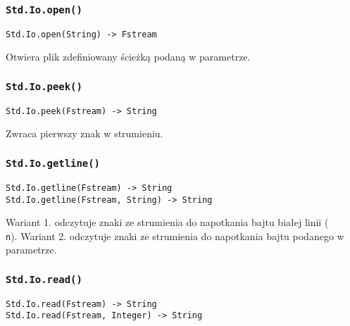 \subsubsection{\texttt{Std.Io.open()}}

\begin{small}
\begin{lstlisting}
Std.Io.open(String) -> Fstream
\end{lstlisting}
\end{small}

Otwiera plik zdefiniowany ścieżką podaną w parametrze.

\subsubsection{\texttt{Std.Io.peek()}}

\begin{small}
\begin{lstlisting}
Std.Io.peek(Fstream) -> String
\end{lstlisting}
\end{small}

Zwraca pierwszy znak w strumieniu.

\subsubsection{\texttt{Std.Io.getline()}}

\begin{small}
\begin{lstlisting}
Std.Io.getline(Fstream) -> String
Std.Io.getline(Fstream, String) -> String
\end{lstlisting}
\end{small}

Wariant 1. odczytuje znaki ze strumienia do napotkania bajtu białej linii (\texttt{\\n}).
Wariant 2. odczytuje znaki ze strumienia do napotkania bajtu podanego w parametrze.

\subsubsection{\texttt{Std.Io.read()}}

\begin{small}
\begin{lstlisting}
Std.Io.read(Fstream) -> String
Std.Io.read(Fstream, Integer) -> String
\end{lstlisting}
\end{small}


